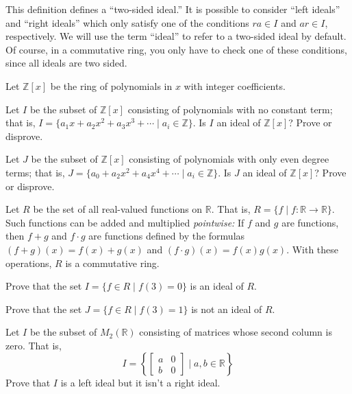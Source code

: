 This definition defines a ``two-sided ideal.'' It is possible to consider ``left ideals'' and ``right ideals'' which only satisfy one of the conditions \(ra \in I\) and \(ar \in I\), respectively. We will use the term ``ideal'' to refer to a two-sided ideal by default. Of course, in a commutative ring, you only have to check one of these conditions, since all ideals are two sided.

\begin{problem}
Let \(\mathbb{Z}[x]\) be the ring of polynomials in \(x\) with integer coefficients.
\begin{problemparts}
  \item Let \(I\) be the subset of \(\mathbb{Z}[x]\) consisting of polynomials with no constant term; that is, \(I = \{a_1x+a_2x^2+a_3x^3 + \cdots \mid a_i \in \mathbb{Z} \}\). Is \(I\) an ideal of \(\mathbb{Z}[x]\)? Prove or disprove.
  \item Let \(J\) be the subset of \(\mathbb{Z}[x]\) consisting of polynomials with only even degree terms; that is, \(J = \{a_0+a_2x^2+a_4x^4 + \cdots \mid a_i \in \mathbb{Z} \}\). Is \(J\) an ideal of \(\mathbb{Z}[x]\)? Prove or disprove.
\end{problemparts}
\end{problem}

\begin{problem}
Let \(R\) be the set of all real-valued functions on \(\mathbb{R}\). That is, \(R = \{ f \mid f : \mathbb{R}\longrightarrow \mathbb{R} \} \). Such functions can be added and multiplied \emph{pointwise:} If \(f\) and \(g\) are functions, then \(f+g\) and \(f\cdot g\) are functions defined by the formulas \((f+g)(x) = f(x)+g(x)\) and \((f\cdot g)(x) = f(x)g(x) \). With these operations, \(R\) is a commutative ring.
\begin{problemparts}
  \item Prove that the set \(I = \{ f \in R \mid f(3)=0\} \) is an ideal of \(R\).
  \item Prove that the set \(J = \{ f \in R \mid f(3)=1\} \) is not an ideal of \(R\).
\end{problemparts}
\end{problem}

\begin{problem}\label{prob:noncomring}
Let \(I\) be the subset of \(M_2(\mathbb{R})\) consisting of matrices whose second column is zero. That is, \[I=\left\{ \begin{bmatrix}a & 0 \\ b & 0\end{bmatrix} \mid a,b\in \mathbb{R}\right\}\]
Prove that \(I\) is a left ideal but it isn't a right ideal.
\begin{annotation}
\end{annotation}
\end{problem}

